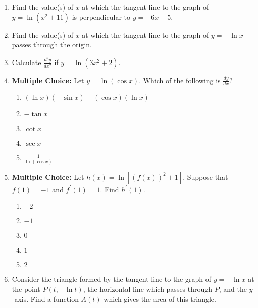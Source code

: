 \documentclass[12pt]{article}
\newif\ifans
\begin{document}
\begin{enumerate}
\ifans{\fbox{$y=4x-8$}} \fi

\item Find the value(s) of $x$ at which the tangent line to the graph of $y=\ln{(x^2+11)}$  is perpendicular to $y=-6x+5$.

\ifans{\fbox{$x=1$ and $x=11$}} \fi

\item Find the value(s) of $x$ at which the tangent line to the graph of $y=-\ln{x}$ passes through the origin.

\ifans{\fbox{$x=e$}} \fi

\item Calculate $\frac{d^2y}{dx^2}$ if $y=\ln{(3x^2+2)}$.

\ifans{\fbox{$\frac{12-18x^2}{(3x^2+2)^2}$}} \fi

\newpage

\item {\bf Multiple Choice:} Let $y=\ln{(\cos{x})}$.  Which of the following is $\frac{dy}{dx}$?

\begin{enumerate}

\item $(\ln{x})(-\sin{x})+(\cos{x})(\ln{x})$

\item $-\tan{x}$

\item $\cot{x}$

\item $\sec{x}$

\item $\frac{1}{\ln{(\cos{x})}}$

\end{enumerate}

\ifans{\fbox{B}} \fi

\item {\bf Multiple Choice:} Let $h(x)=\ln[(f(x))^2+1]$.  Suppose that $f(1)=-1$ and $f^{\prime}(1)=1$.  Find $h^{\prime}(1)$.

\begin{enumerate}

\item $-2$

\item $-1$

\item $0$

\item $1$

\item $2$

\end{enumerate}

\ifans{\fbox{B}} \fi

\item Consider the triangle formed by the tangent line to the graph of $y=-\ln{x}$ at the point $P(t,-\ln{t})$, the horizontal line which passes through $P$, and the $y$-axis. Find a function $A(t)$ which gives the area of this triangle.  

\ifans{\fbox{$A(t)=\frac{1}{2}t$}} \fi

\end{enumerate}
\end{document}
